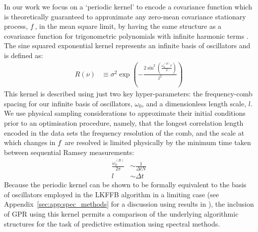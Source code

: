 In our work we focus on a `periodic kernel' to encode a covariance function which is theoretically guaranteed to approximate any zero-mean covariance stationary process, $f$, in the mean square limit, by having the same structure as a covariance function for trigonometric polynomials with infinite harmonic terms \cite{solin2014explicit, karlin1975first}. The sine squared exponential kernel represents an infinite basis of oscillators and is defined as:
\begin{align}
	R(\nu) &\equiv \sigma^2 \exp (- \frac{2\sin^2(\frac{\omega_0^{(B)}\nu}{2})}{l^2}) 
\end{align} 
This kernel is described using just two key hyper-parameters: the frequency-comb spacing for our infinite basis of oscillators, $\omega_0$, and a dimensionless length scale, $l$. We use physical sampling considerations to approximate their initial conditions prior to an optimisation procedure, namely, that the longest correlation length encoded in the data sets the frequency resolution of the comb, and the scale at which changes in $f$ are resolved is limited physically by the minimum time taken between sequential Ramsey measurements:
\begin{align}
	\frac{\omega_0^{(B)}}{2\pi} & \sim  \frac{1}{\Delta t N} \\
	l & \sim \Delta t
\end{align} 
Because the periodic kernel can be shown to be formally equivalent to the basis of oscillators employed in the LKFFB algorithm in a limiting case (see Appendix~\ref{sec:app:spec_methods} for a discussion using results in \cite{solin2014explicit}), the inclusion of GPR using this kernel permits a comparison of the underlying algorithmic structures for the task of predictive estimation using spectral methods.


